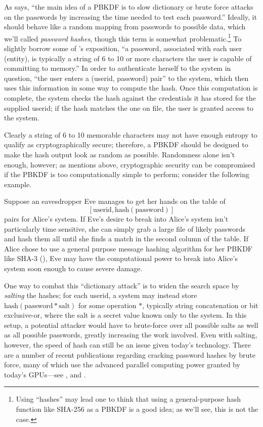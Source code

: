 As \cite{turan2010recommendation} says, ``the main idea of a PBKDF is to slow
    dictionary or brute force attacks on the passwords by increasing the time
    needed to test each password.''
Ideally, it should behave like a random mapping from passwords to possible
    data, which we'll called \textit{password hashes}, though this term is
    somewhat problematic.\footnote{Using ``hashes'' may lead one to think that
    using a general-purpose hash function like SHA-256 as a PBKDF is a good
    idea; as we'll see, this is not the case.}
To slightly borrow some of \cite{menezes1996handbook}'s exposition, ``a
    password, associated with each user (entity), is typically a string of 6 to
    10 or more characters the user is capable of committing to memory.''
In order to authenticate herself to the system in question, ``the user enters a
    (userid, password) pair'' to the system, which then uses this information
    in some way to compute the hash.
Once this computation is complete, the system checks the hash against the
    credentials it has stored for the supplied userid; if the hash matches the
    one on file, the user is granted access to the system.

Clearly a string of 6 to 10 memorable characters may not have enough entropy to
    qualify as cryptographically secure; therefore, a PBKDF should be designed
    to make the hash output look as random as possible.
Randomness alone isn't enough, however; as \cite{percival2009stronger} mentions
    above, cryptographic security can be compromised if the PBKDF is too
    computationally simple to perform; consider the following example.
\begin{ex}
Suppose an eavesdropper Eve manages to get her hands on the table of
\[
[\mathrm{userid}, \mathrm{hash}(\mathrm{password})]
\]
    pairs for Alice's system.
If Eve's desire to break into Alice's system isn't particularly time sensitive,
    she can simply grab a large file of likely passwords and hash them all
    until she finds a match in the second column of the table.
If Alice chose to use a general purpose message hashing algorithm for her
    PBKDF like SHA-3 (\cite{baum2012nist}), Eve may have the computational
    power to break into Alice's system soon enough to cause severe damage.
\end{ex}

One way to combat this ``dictionary attack'' is to widen the search space by
    \textit{salting} the hashes; for each userid, a system may instead store
    $\mathrm{hash}(\mathrm{password} \ast \mathrm{salt})$ for some operation
    $\ast$, typically string concatenation or bit exclusive-or, where the salt
    is a secret value known only to the system.
In this setup, a potential attacker would have to brute-force over all possible
    salts as well as all possible passwords, greatly increasing the work
    involved.
Even with salting, however, the speed of hash can still be an issue given
    today's technology.
There are a number of recent publications regarding cracking password hashes by
    brute force, many of which use the advanced parallel computing power
    granted by today's GPUs---see \cite{alnoonexecuting,
    gomez2010cryptanalysis, lim2004parallelization}, and
    \cite{zonenberg2009distributed}.

